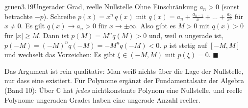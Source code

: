 \begin{loesungkarte}{gruen}{3.19}{Ungerader Grad, reelle Nullstelle}
Ohne Einschränkung $a_n > 0$ (sonst betrachte $-p$). Schreibe $p(x) = x^{n}\,q(x)$ mit $q(x) = a_n + \frac{a_{n-1}}x + \dots + \frac{a_0}{x^{n}}$ für $x\neq0$. Es gilt $q(x)\to a_n > 0$ für $x\to\pm\infty$.
Also gibt es $M > 0$ mit $q(x) > 0$ für $|x|\ge M$. Dann ist $p(M) = M^{n}q(M) > 0$ und, weil $n$ ungerade ist, $p(-M) = (-M)^{n}q(-M) = -M^{n}q(-M) < 0$.
$p$ ist stetig auf $[-M, M]$ und wechselt das Vorzeichen: Es gibt $\xi\in(-M, M)$ mit $p(\xi) = 0$. $\blacksquare$
\begin{mitnehmen}\kastentext
Das Argument ist rein qualitativ: Man weiß nichts über die Lage der Nullstelle, nur dass eine existiert. Für Polynome ergänzt der Fundamentalsatz der Algebra (Band 10): Über $\mathbb C$ hat \emph{jedes} nichtkonstante Polynom eine Nullstelle, und reelle Polynome ungeraden Grades haben eine ungerade Anzahl reeller.
\end{mitnehmen}
\end{loesungkarte}

